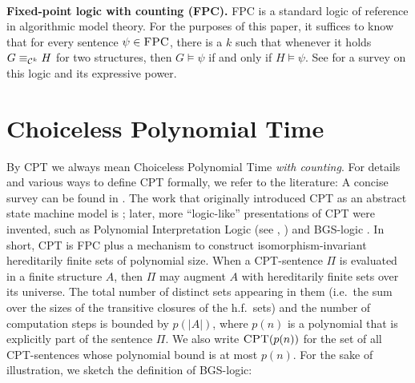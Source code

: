 \documentclass[10pt,a4paper]{article}
\newcommand{\FPC}{\mbox{\sc FPC}}
\newcommand{\CPT}{\mbox{\sc CPT}}
\newcommand{\Cc}{{\cal C}}
\begin{document}
	\\
	\textbf{Fixed-point logic with counting (FPC).} FPC is a standard logic of reference in algorithmic model theory. For the purposes of this paper, it suffices to know that for every sentence $\psi \in \FPC$, there is a $k$ such that whenever it holds $G \equiv_{\Cc^k} H$ for two structures, then $G \models \psi$ if and only if $H \models \psi$.
	See \cite{dawar2015nature} for a survey on this logic and its expressive power.
	
	
	
	\section{Choiceless Polynomial Time}
	\label{sec:CPT}
	By CPT we always mean Choiceless Polynomial Time \emph{with counting}. For details and various ways to define CPT formally, we refer to the literature: A concise survey can be found in \cite{gradel2015polynomial}. The work that originally introduced CPT as an abstract state machine model is \cite{blass1999}; later, more ``logic-like'' presentations of CPT were invented, such as Polynomial Interpretation Logic (see \cite{grapakschalkai15}, \cite{svenja}) and BGS-logic \cite{rossman2010choiceless}. In short, CPT is FPC plus a mechanism to construct isomorphism-invariant hereditarily finite sets of polynomial size. When a CPT-sentence $\Pi$ is evaluated in a finite structure $A$, then $\Pi$ may augment $A$ with hereditarily finite sets over its universe. The total number of distinct sets appearing in them (i.e.\ the sum over the sizes of the transitive closures of the h.f.\ sets) and the number of computation steps is bounded by $p(|A|)$, where $p(n)$ is a polynomial that is explicitly part of the sentence $\Pi$. We also write $\CPT(p(n))$ for the set of all CPT-sentences whose polynomial bound is at most $p(n)$. For the sake of illustration, we sketch the definition of BGS-logic:\\
	
\end{document}
